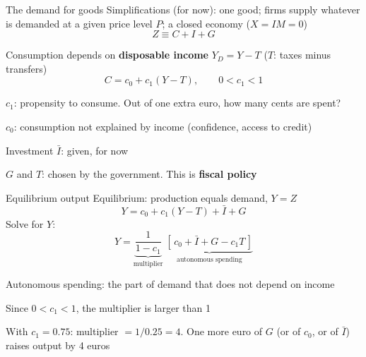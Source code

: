 \documentclass[aspectratio=169,xcolor=table]{beamer}
\begin{document}
\begin{frame}{The demand for goods}
\footnotesize
Simplifications (for now): one good; firms supply whatever is demanded at a given price level $P$; a closed economy ($X = IM = 0$)
\[
Z \equiv C + I + G
\]
\bi
  \item Consumption depends on \textbf{disposable income} $Y_D = Y - T$ ($T$: taxes minus transfers)
  \[
  C = c_0 + c_1 (Y - T), \qquad 0 < c_1 < 1
  \]
  \bi
    \item $c_1$: propensity to consume. Out of one extra euro, how many cents are spent?
    \item $c_0$: consumption not explained by income (confidence, access to credit)
  \ei
  \item Investment $\bar I$: given, for now
  \item $G$ and $T$: chosen by the government. This is \textbf{fiscal policy}
\ei
{}
\end{frame}

\begin{frame}{Equilibrium output}
\small
Equilibrium: production equals demand, $Y = Z$
\[
Y = c_0 + c_1 (Y - T) + \bar I + G
\]
Solve for $Y$:
\[
Y = \underbrace{\frac{1}{1-c_1}}_{\text{multiplier}} \; \underbrace{\left[\,c_0 + \bar I + G - c_1 T\,\right]}_{\text{autonomous spending}}
\]
\bi
  \item Autonomous spending: the part of demand that does not depend on income
  \item Since $0 < c_1 < 1$, the multiplier is larger than 1
  \item With $c_1 = 0.75$: multiplier $= 1/0.25 = 4$. One more euro of $G$ (or of $c_0$, or of $\bar I$) raises output by 4 euros
\ei
\end{frame}
\end{document}
